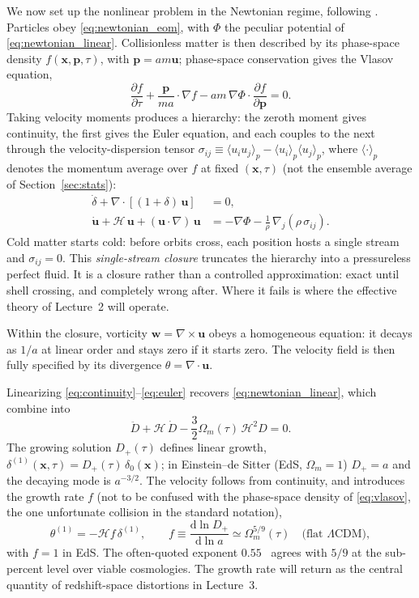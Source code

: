 \documentclass[a4paper,11pt]{article}
\newcommand{\vx}{\bm{x}}
\newcommand{\vp}{\bm{p}}
\newcommand{\vu}{\bm{u}}
\def\cH{\mathcal{H}}
\newcommand{\dd}{\mathrm{d}}
\def\lcdm{$\Lambda$CDM}
\def\Om{\Omega_m}
\numberwithin{equation}{section}
\begin{document}
We now set up the nonlinear problem in the Newtonian regime, following \cite[\S 2]{Bernardeau2002}. Particles obey \eqref{eq:newtonian_eom}, with $\Phi$ the peculiar potential of \eqref{eq:newtonian_linear}. Collisionless matter is then described by its phase-space density $f(\vx,\vp,\tau)$, with $\vp = am\vu$; phase-space conservation gives the Vlasov equation,
\begin{equation}
\frac{\partial f}{\partial\tau} + \frac{\vp}{ma}\cdot\nabla f - am\,\nabla\Phi\cdot\frac{\partial f}{\partial\vp} = 0 .
\label{eq:vlasov}
\end{equation}
Taking velocity moments produces a hierarchy: the zeroth moment gives continuity, the first gives the Euler equation, and each couples to the next through the velocity-dispersion tensor $\sigma_{ij} \equiv \langle u_iu_j\rangle_p - \langle u_i\rangle_p\langle u_j\rangle_p$, where $\langle\cdot\rangle_p$ denotes the momentum average over $f$ at fixed $(\vx,\tau)$ (not the ensemble average of Section~\ref{sec:stats}):
\begin{align}
\dot\delta + \nabla\cdot\left[(1+\delta)\,\vu\right] &= 0 ,
\label{eq:continuity}\\
\dot{\vu} + \cH\,\vu + (\vu\cdot\nabla)\,\vu &= -\nabla\Phi - \frac{1}{\rho}\,\nabla_j\!\left(\rho\,\sigma_{ij}\right).
\label{eq:euler}
\end{align}
Cold matter starts cold: before orbits cross, each position hosts a single stream and $\sigma_{ij} = 0$. This \emph{single-stream closure} truncates the hierarchy into a pressureless perfect fluid. It is a closure rather than a controlled approximation: exact until shell crossing, and completely wrong after. Where it fails is where the effective theory of Lecture~2 will operate.

Within the closure, vorticity $\bm{w} = \nabla\times\vu$ obeys a homogeneous equation: it decays as $1/a$ at linear order and stays zero if it starts zero. The velocity field is then fully specified by its divergence $\theta = \nabla\cdot\vu$.

Linearizing \eqref{eq:continuity}--\eqref{eq:euler} recovers \eqref{eq:newtonian_linear}, which combine into
\begin{equation}
\ddot D + \cH\,\dot D - \frac{3}{2}\Om(\tau)\,\cH^2 D = 0 .
\label{eq:growth}
\end{equation}
The growing solution $D_+(\tau)$ defines linear growth, $\delta^{(1)}(\vx,\tau) = D_+(\tau)\,\delta_0(\vx)$; in Einstein--de Sitter (EdS, $\Om = 1$) $D_+ = a$ and the decaying mode is $a^{-3/2}$. The velocity follows from continuity, and introduces the growth rate $f$ (not to be confused with the phase-space density of \eqref{eq:vlasov}, the one unfortunate collision in the standard notation),
\begin{equation}
\theta^{(1)} = -\cH f\,\delta^{(1)},
\qquad
f \equiv \frac{\dd\ln D_+}{\dd\ln a}
\simeq \Om^{5/9}(\tau) \quad\text{(flat \lcdm)} ,
\label{eq:growth_rate}
\end{equation}
with $f = 1$ in EdS. The often-quoted exponent $0.55$~\cite{Linder2005} agrees with $5/9$ at the sub-percent level over viable cosmologies. The growth rate will return as the central quantity of redshift-space distortions in Lecture~3.
\end{document}
